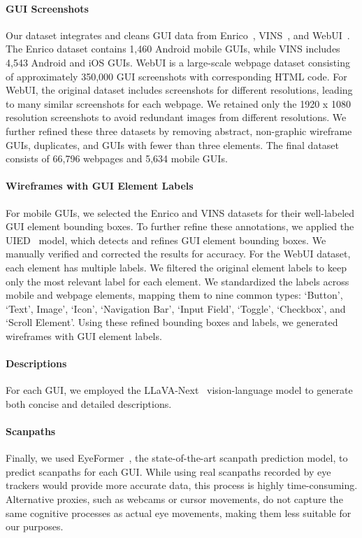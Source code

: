 \paragraph{GUI Screenshots} Our dataset integrates and cleans GUI data from Enrico~\cite{enrico}, VINS~\cite{vins}, and WebUI~\cite{webui}. The Enrico dataset contains 1,460 Android mobile GUIs, while VINS includes 4,543 Android and iOS GUIs. WebUI is a large-scale webpage dataset consisting of approximately 350,000 GUI screenshots with corresponding HTML code. For WebUI, the original dataset includes screenshots for different resolutions, leading to many similar screenshots for each webpage.
We retained only the 1920 x 1080 resolution screenshots to avoid redundant images from different resolutions. We further refined these three datasets by removing abstract, non-graphic wireframe GUIs, duplicates, and GUIs with fewer than three elements.  The final dataset consists of 66,796 webpages and 5,634 mobile GUIs.

\paragraph{Wireframes with GUI Element Labels} 

For mobile GUIs, we selected the Enrico and VINS datasets for their well-labeled GUI element bounding boxes. To further refine these annotations, we applied the UIED~\cite{uied} model, which detects and refines GUI element bounding boxes. We manually verified and corrected the results for accuracy. For the WebUI dataset, each element has multiple labels. We filtered the original element labels to keep only the most relevant label for each element. We standardized the labels across mobile and webpage elements, mapping them to nine common types: `Button', `Text', Image', `Icon', `Navigation Bar', `Input Field', `Toggle', `Checkbox', and `Scroll Element'. Using these refined bounding boxes and labels, we generated wireframes with GUI element labels.

\paragraph{Descriptions} For each GUI, we employed the LLaVA-Next~\cite{liu2024llavanext} vision-language model to generate both concise and detailed descriptions.

\paragraph{Scanpaths} Finally, we used EyeFormer~\cite{eyeformer}, the state-of-the-art scanpath prediction model, to predict scanpaths for each GUI. While using real scanpaths recorded by eye trackers would provide more accurate data, this process is highly time-consuming. Alternative proxies, such as webcams or cursor movements, do not capture the same cognitive processes as actual eye movements, making them less suitable for our purposes.